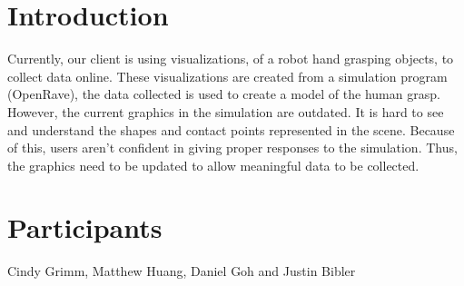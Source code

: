 \documentclass[10pt,journal,compsoc]{IEEEtran}
\begin{document}
\section*{Introduction}
\vspace{3mm}
Currently, our client is using visualizations, of a robot hand grasping objects, to collect data online.
These visualizations are created from a simulation program (OpenRave), the data collected is used to create a model of the human grasp.
However, the current graphics in the simulation are outdated.
It is hard to see and understand the shapes and contact points represented in the scene.
Because of this, users aren't confident in giving proper responses to the simulation.
Thus, the graphics need to be updated to allow meaningful data to be collected. \\


\section*{Participants}
\vspace{3mm}
Cindy Grimm, Matthew Huang, Daniel Goh and Justin Bibler \\ 

\newpage

\tableofcontents
\end{document}
